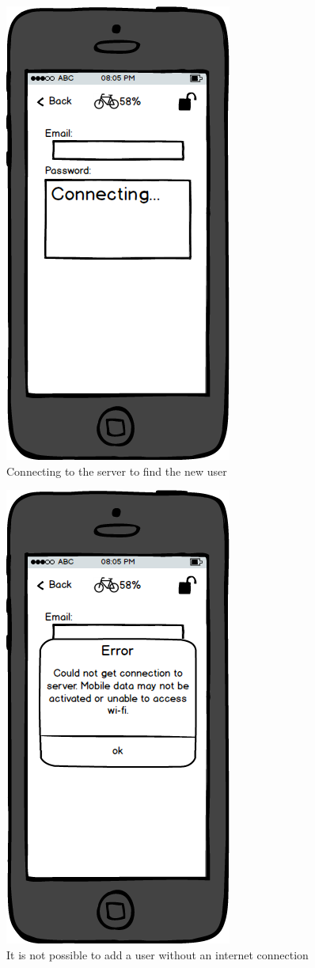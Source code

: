 \documentclass[a4paper]{report}
\begin{document}
\clearpage
\begin{figure}
\centering
\includegraphics[scale=0.9]{figures/prototype_2/add_user_conn}
\caption{Connecting to the server to find the new user}
\end{figure}
\clearpage
\begin{figure}
\centering
\includegraphics[scale=0.9]{figures/prototype_2/add_user_err_conn}
\caption{It is not possible to add a user without an internet connection}
\end{figure}
\end{document}

